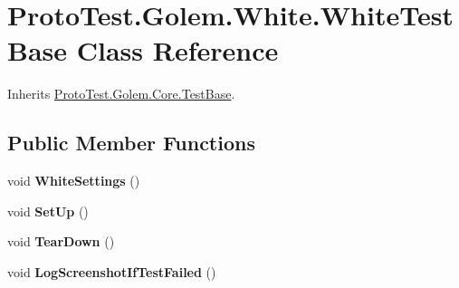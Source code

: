 \hypertarget{class_proto_test_1_1_golem_1_1_white_1_1_white_test_base}{\section{Proto\-Test.\-Golem.\-White.\-White\-Test\-Base Class Reference}
\label{class_proto_test_1_1_golem_1_1_white_1_1_white_test_base}
}


Inherits \hyperlink{class_proto_test_1_1_golem_1_1_core_1_1_test_base}{Proto\-Test.\-Golem.\-Core.\-Test\-Base}.

\subsection*{Public Member Functions}
\begin{DoxyCompactItemize}
\item 
\hypertarget{class_proto_test_1_1_golem_1_1_white_1_1_white_test_base_a190862bcbfc20f8ef5b1de2ba7e513d5}{void {\bfseries White\-Settings} ()}\label{class_proto_test_1_1_golem_1_1_white_1_1_white_test_base_a190862bcbfc20f8ef5b1de2ba7e513d5}

\item 
\hypertarget{class_proto_test_1_1_golem_1_1_white_1_1_white_test_base_a357cbe85f0e195919fa5d33f15519858}{void {\bfseries Set\-Up} ()}\label{class_proto_test_1_1_golem_1_1_white_1_1_white_test_base_a357cbe85f0e195919fa5d33f15519858}

\item 
\hypertarget{class_proto_test_1_1_golem_1_1_white_1_1_white_test_base_a4f67c28eb0eec6f9eaea3def1c4abd86}{void {\bfseries Tear\-Down} ()}\label{class_proto_test_1_1_golem_1_1_white_1_1_white_test_base_a4f67c28eb0eec6f9eaea3def1c4abd86}

\item 
\hypertarget{class_proto_test_1_1_golem_1_1_white_1_1_white_test_base_a8c83485dd10fe92bac2a1bf9c9c60c32}{void {\bfseries Log\-Screenshot\-If\-Test\-Failed} ()}\label{class_proto_test_1_1_golem_1_1_white_1_1_white_test_base_a8c83485dd10fe92bac2a1bf9c9c60c32}

\end{DoxyCompactItemize}
